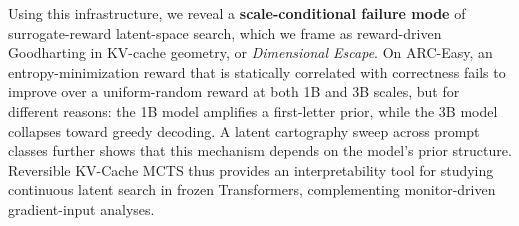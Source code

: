 Using this infrastructure, we reveal a \textbf{scale-conditional failure mode} of surrogate-reward latent-space search, which we frame as reward-driven Goodharting in KV-cache geometry, or \emph{Dimensional Escape}. On ARC-Easy, an entropy-minimization reward that is statically correlated with correctness fails to improve over a uniform-random reward at both 1B and 3B scales, but for different reasons: the 1B model amplifies a first-letter prior, while the 3B model collapses toward greedy decoding. A latent cartography sweep across prompt classes further shows that this mechanism depends on the model's prior structure. Reversible KV-Cache MCTS thus provides an interpretability tool for studying continuous latent search in frozen Transformers, complementing monitor-driven gradient-input analyses.